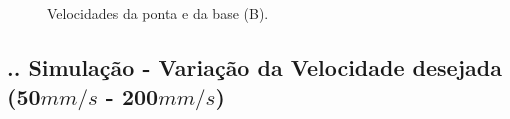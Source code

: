 \documentclass[aspectratio=169]{beamer}
\begin{document}
\begin{frame}
  \frametitle{\insertsubsection}
  \begin{figure}[H]
    \centering
    \caption{Velocidades da ponta e da base (B).}
    \hfill
    \label{fig:3B_vel}
  \end{figure}
\end{frame}

\subsection{\insertsectionnumber .\insertsubsectionnumber . Simulação - Variação da Velocidade desejada (50$mm/s$ - 200$mm/s$)}
\end{document}
